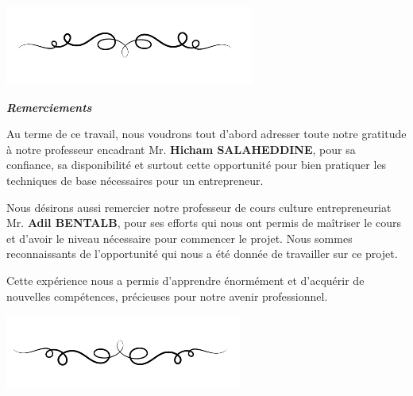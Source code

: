 \begin{center}
    \vspace{-1cm} %
    \includegraphics[scale=2.5]{logos/motif decoratif haut.PNG } %
\end{center}

\begin{center}
    {\itshape \LARGE \textbf{Remerciements }} %
\end{center}
\vspace{1cm}

\begin{center}
\noindent
Au terme de ce travail, nous voudrons tout d’abord adresser toute notre gratitude à notre professeur encadrant Mr. \textbf{Hicham SALAHEDDINE}, pour sa confiance, sa disponibilité et surtout cette opportunité pour bien pratiquer les techniques de base nécessaires pour un entrepreneur. \\
\end{center}

\vspace{0.5cm}

\begin{center}
\noindent
Nous désirons aussi remercier notre professeur de cours culture entrepreneuriat Mr. \textbf{Adil BENTALB}, pour ses efforts qui nous ont permis de maîtriser le cours et d’avoir le niveau nécessaire pour commencer le projet.
Nous sommes reconnaissants de l’opportunité qui nous a été donnée de travailler sur ce projet.
\end{center}

\vspace{0.5cm}

\begin{center}
\noindent
Cette expérience nous a permis d’apprendre énormément et d’acquérir de nouvelles compétences, précieuses pour notre avenir professionnel.
\end{center}
\vspace{1.5cm}

\begin{center}
    \includegraphics[scale=2.5]{logos/motif decoratif bas.PNG} %
\end{center}
